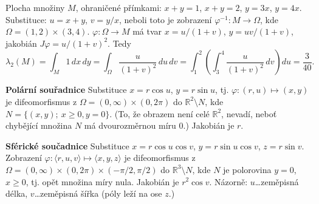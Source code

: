 \begin{priklad}
Plocha množiny $M$, ohraničené přímkami: $x + y = 1$, $x + y = 2$,
$y = 3x$, $y = 4x$. Substituce: $u = x+y$, $v = y/x$, neboli toto je
zobrazení $\varphi^{-1} : M \to \Omega$, kde
$\Omega = (1, 2) \times (3, 4)$. $\varphi : \Omega \to M$ má tvar
$x = u/(1+v)$, $y = uv/(1+v)$, jakobián $J\varphi = u/(1+v)^2$. Tedy
\[
\lambda_2(M) = \int_M 1 \, dx\, dy
= \int_\Omega \frac{u}{(1+v)^2} \, du\, dv
= \int_1^2 \left( \int_3^4 \frac{u}{(1+v)^2} \, dv \right) du
= \frac{3}{40}.
\]
\end{priklad}

\textbf{Polární souřadnice}
Substituce $x = r\cos u$, $y = r\sin u$, tj.
$\varphi : (r, u) \mapsto (x, y)$ je difeomorfismus z
$\Omega = (0, \infty) \times (0, 2\pi)$ do
$\mathbb{R}^2 \setminus N$, kde
$N = \{(x, y); \ x \ge 0, y = 0\}$. (To, že obrazem není celé
$\mathbb{R}^2$, nevadí, neboť chybějící množina $N$ má dvourozměrnou
míru 0.) Jakobián je $r$.

\textbf{Sférické součadnice}
Substituce $x = r\cos u\cos v$, $y = r\sin u\cos v$, $z = r\sin v$.
Zobrazení $\varphi : \langle r, u, v \rangle \mapsto \langle x, y, z
\rangle$ je difeomorfismus z
$\Omega = (0, \infty) \times (0, 2\pi) \times (-\pi/2, \pi/2)$ do
$\mathbb{R}^3 \setminus N$, kde $N$ je polorovina $y = 0$,
$x \ge 0$, tj. opět množina míry nula. Jakobián je $r^2\cos v$.
Názorně: $u$\ldots zeměpisná délka, $v$\ldots zeměpisná šířka (póly
leží na ose $z$.)
